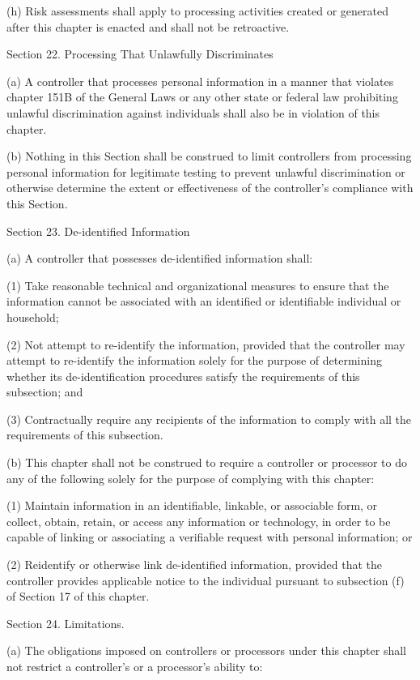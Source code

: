 (h) Risk assessments shall apply to processing activities created or generated after this chapter is enacted and shall not be retroactive.

Section 22. Processing That Unlawfully Discriminates

(a) A controller that processes personal information in a manner that violates chapter 151B of the General Laws or any other state or federal law prohibiting unlawful discrimination against individuals shall also be in violation of this chapter.

(b) Nothing in this Section shall be construed to limit controllers from processing personal information for legitimate testing to prevent unlawful discrimination or otherwise determine the extent or effectiveness of the controller’s compliance with this Section.

Section 23. De-identified Information

(a) A controller that possesses de-identified information shall:

(1) Take reasonable technical and organizational measures to ensure that the information cannot be associated with an identified or identifiable individual or household;

(2) Not attempt to re-identify the information, provided that the controller may attempt to re-identify the information solely for the purpose of determining whether its de-identification procedures satisfy the requirements of this subsection; and

(3) Contractually require any recipients of the information to comply with all the requirements of this subsection.  

(b) This chapter shall not be construed to require a controller or processor to do any of the following solely for the purpose of complying with this chapter:

(1) Maintain information in an identifiable, linkable, or associable form, or collect, obtain, retain, or access any information or technology, in order to be capable of linking or associating a verifiable request with personal information; or

(2) Reidentify or otherwise link de-identified information, provided that the controller provides applicable notice to the individual pursuant to subsection (f) of Section 17 of this chapter. 

Section 24. Limitations.

(a) The obligations imposed on controllers or processors under this chapter shall not restrict a controller’s or a processor’s ability to:

